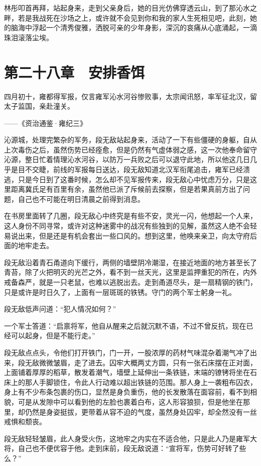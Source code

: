林彤叩首再拜，站起身来，走到父亲身后，她的目光仿佛穿透云山，到了那沁水之畔，若是我战死在沙场之上，或许就不会见到你和我的家人生死相见吧，此刻，她的脑海中浮起一个清秀俊雅，洒脱可亲的少年身影，深沉的哀痛从心底涌起，一滴珠泪滚落尘埃。

\chapter{第二十八章　安排香饵}

四月初十，雍都得军报，仅言雍军沁水河谷惨败事，太宗闻讯怒，率军征北汉，留太子监国，亲赴潼关。

——《资治通鉴·雍纪三》

沁源城，处理完繁杂的军务，段无敌站起身来，活动了一下有些僵硬的身躯，自从上次毒伤之后，虽然伤势已经痊愈，但是仍然有气虚体弱之感，这一次他奉命留守沁源，整日忙着情理沁水河谷，以防万一兵败之后可以退守此地，所以他这几日几乎是目不交睫，前线的军报每日送达，段无敌知道北汉军衔尾追击，雍军已经溃逃，只是今日到了这番时候，怎么却不见军报传来，段无敌心中忧虑万分，只是这里距离冀氏足有百里有余，虽然他已派了斥候前去探察，但是若果真前方出了问题，自己也不可能在明日清晨之前得到消息。

在书房里面转了几圈，段无敌心中终究是有些不安，灵光一闪，他想起一个人来，这人身份不同寻常，或许对这种迷雾中的战况有些独到的见解，虽然这人绝不会轻易说出来，但是还是有机会套出一些口风的。想到这里，他唤来亲卫，向太守府后面的地牢走去。

段无敌沿着青石甬道向下缓行，两侧的墙壁阴冷潮湿，在接近地面的地方甚至长了青苔，除了火把明灭的光芒之外，看不到一丝天光，这里是监押重犯的所在，内外戒备森严，就是一只老鼠，也难以逃脱出去。走到甬道尽头，是一扇精钢的铁门，只是或许是时日久了，上面有一层斑斑的铁锈。守门的两个军士躬身一礼。

段无敌低声问道：“犯人情况如何？”

一个军士答道：“启禀将军，他自从醒来之后就沉默不语，不过不曾反抗，现在已经可以起身，但是不能行走。”

段无敌点点头，令他们打开铁门，门一开，一股浓厚的药材气味混杂着潮气冲了出来，段无敌微微皱眉，走了进去。囚牢大概两丈方圆，只有一张石床摆在正对面，上面铺着厚厚的稻草，散发着潮气，墙壁上延伸出一条铁链，末端的镣铐将坐在石床上的那人手脚锁住，令此人行动难以超出铁链的范围。那人身上一袭粗布囚衣，身上有不少布条包裹的伤口，显然是身负重伤，他的长发散落在面容前，看不到相貌，可是从发隙中可以看到他的左脸也裹着白布，这人形容狼狈，但是他坐在那里，却仍然是身姿挺拔，更带着从容不迫的气度，虽然身处囚牢，却全然没有一丝戒惧和颓丧。

段无敌轻轻皱眉，此人身受火伤，这地牢之内实在不适合他，只是此人乃是雍军大将，自己也不便优容于他。走到床前，段无敌说道：“宣将军，伤势可好转了些么？”

